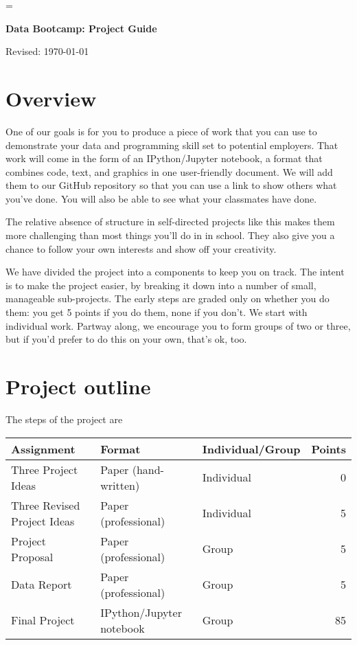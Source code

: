 \documentclass[11pt]{article}
\begin{document}
\parskip=\bigskipamount
\parindent=0.0in
\thispagestyle{empty}


\bigskip\bigskip
\centerline{\Large \bf Data Bootcamp:  Project Guide}
\centerline{Revised: \today}

\section*{Overview}

One of our goals is for you to produce a piece of work that you can use
to demonstrate your data and programming skill set to potential employers.
That work will come in the form of an IPython/Jupyter notebook,
a format that combines code, text, and graphics in one user-friendly document.
We will add them to our GitHub repository so that
you can use a link to show others what you've done.
You will also be able to see what your classmates have done.

The relative absence of structure in self-directed projects like this
makes them more challenging than most things you'll do in in school.
They also give you a chance to
follow your own interests and show off your creativity.

We have divided the project into a components to keep you on track.
The intent is to make the project easier, by breaking it down into a number
of small, manageable sub-projects.
The early steps are graded only on whether you do them:
you get 5 points if you do them, none if you don't.
We start with individual work.  Partway along, we encourage you to form groups
of two or three, but if you'd prefer to do this on your own,
that's ok, too.


\section*{Project outline}

The steps of the project are
%
\begin{center}
\begin{tabular}{lllr}
\toprule
Assignment                  & Format  & Individual/Group &  Points \\
\midrule
Three Project Ideas         & Paper (hand-written)  & Individual  & 0  \\
Three Revised Project Ideas & Paper (professional)  & Individual  & 5  \\
Project Proposal            & Paper (professional)  & Group       & 5  \\
Data Report                 & Paper (professional)  & Group       & 5  \\
Final Project               & IPython/Jupyter notebook      & Group       & 85 \\
\bottomrule
\end{tabular}
\end{center}
\end{document}
